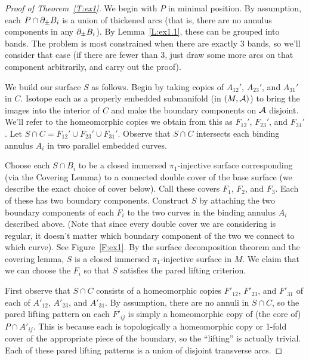 \begin{proof}[Proof of Theorem~\ref{T:ex1}]

We begin with $P$ in minimal position. By assumption, each $P \cap \partial_\pm B_i$
is a union of thickened arcs (that is, there are no annulus components in any
$\partial_\pm B_i$). By Lemma~\ref{L:ex1.1}, these can be grouped into bands. The
problem is most constrained when there are exactly 3 bands, so we'll consider
that case (if there are fewer than 3, just draw some more arcs on that
component arbitrarily, and carry out the proof).

We build our surface $S$ as follows. Begin by taking copies of  $A_{12}'$,
$A_{23}'$, and $A_{31}'$ in $C$. Isotope each as a properly embedded
submanifold (in $(M,\mathcal{A})$) to bring the images into the interior of $C$ and
make the boundary components on $\mathcal{A}$ disjoint. We'll refer to the homeomorphic
copies we obtain from this as $F_{12}'$, $F_{23}'$, and $F_{31}'$. Let $S\cap
C = F_{12}' \cup F_{23}' \cup F_{31}'$. Observe that $S\cap C$ intersects each
binding annulus $A_i$ in two parallel embedded curves.

Choose each $S \cap B_i$ to be a closed immersed $\pi_1$-injective surface
corresponding (via the Covering Lemma) to a connected double cover of the base
surface (we describe the exact choice of cover below). Call these covers $F_1$,
$F_2$, and $F_3$.  Each of these has two boundary components. Construct $S$ by
attaching the two boundary components of each $F_i$ to the two curves in the
binding annulus $A_i$ described above. (Note that since every double cover we
are considering is regular, it doesn't matter which boundary component of the
two we connect to which curve). See Figure~\ref{F:ex1}. By the surface
decomposition theorem and the covering lemma, $S$ is a closed immersed
$\pi_1$-injective surface in $M$.  We claim that we can choose the $F_i$ so
that $S$ satisfies the pared lifting criterion.


First observe that $S \cap C$ consists of a homeomorphic copies $F'_{12}$,
$F'_{23}$, and $F'_{31}$ of each of $A'_{12}$, $A'_{23}$, and $A'_{31}$. By
assumption, there are no annuli in $S \cap C$, so the pared lifting pattern on
each $F'_{ij}$ is simply a homeomorphic copy of (the core of) $P \cap A'_{ij}$.
This is because each is topologically a homeomorphic copy or 1-fold cover of
the appropriate piece of the boundary, so the ``lifting'' is actually trivial.
Each of these pared lifting patterns is a union of disjoint transverse arcs.


\end{proof}
